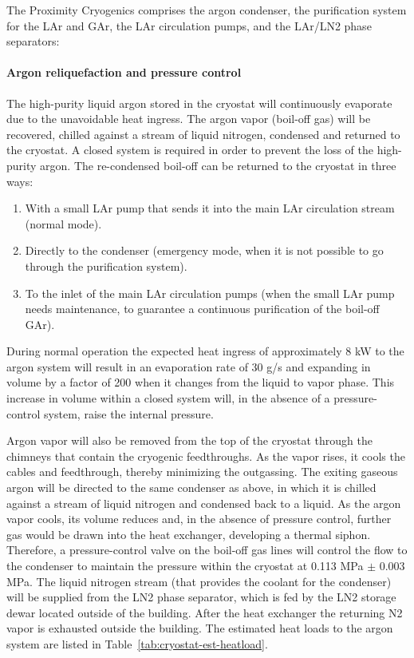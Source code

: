 The Proximity Cryogenics comprises the argon condenser, the purification system for the LAr and GAr, the LAr circulation pumps, and the LAr/LN2 phase separators:

\paragraph{Argon reliquefaction and pressure control}

The high-purity liquid argon stored in the cryostat will continuously evaporate due to the unavoidable heat ingress. The argon vapor (boil-off gas) will be recovered, chilled against a stream of liquid nitrogen, condensed and returned to the cryostat. A closed system is required in order to prevent the loss of the high-purity argon. The re-condensed boil-off can be returned to the cryostat in three ways:
\begin{enumerate}
\item With a small LAr pump that sends it into the main LAr circulation stream (normal mode).
\item Directly to the condenser (emergency mode, when it is not possible to go through the purification system).
\item To the inlet of the main LAr circulation pumps (when the small LAr pump needs maintenance, to guarantee a continuous purification of the boil-off GAr).
\end{enumerate}

During normal operation the expected heat ingress of approximately 8 kW to the argon system will result in an evaporation rate of 30 g/s and expanding in volume by a factor of 200 when it changes from the liquid to vapor phase. This increase in volume within a closed system will, in the absence of a pressure-control system, raise the internal pressure.

Argon vapor will also be removed from the top of the cryostat through the chimneys that contain the cryogenic feedthroughs. As the vapor rises, it cools the cables and feedthrough, thereby minimizing the outgassing. The exiting gaseous argon will be directed to the same condenser as above, in which it is chilled against a stream of liquid nitrogen and condensed back to a liquid. As the argon vapor cools, its volume reduces and, in the absence of pressure control, further gas would be drawn into the heat exchanger, developing a thermal siphon. Therefore, a pressure-control valve on the boil-off gas lines will control the flow to the condenser to maintain the pressure within the cryostat at 0.113 MPa $\pm$ 0.003 MPa. The liquid nitrogen stream (that provides the coolant for the condenser) will be supplied from the LN2 phase separator, which is fed by the LN2 storage dewar located outside of the building. After the heat exchanger the returning N2 vapor is exhausted outside the building. The estimated heat loads to the argon system are listed in Table~\ref{tab:cryostat-est-heatload}.

